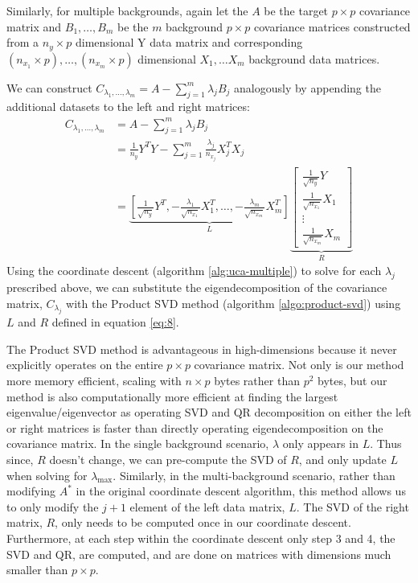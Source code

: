 \documentclass[12pt]{article}
\begin{document}
Similarly, for multiple backgrounds, again let the $A$ be the target $p \times p$ covariance matrix and $ B_1, \ldots, B_m$ be the $m$ background $p \times p$ covariance matrices constructed from a $n_y \times p$ dimensional Y data matrix and corresponding $(n_{x_1} \times p), \ldots, (n_{x_m}\times p)$ dimensional $X_1, \ldots X_m$ background data matrices.

We can construct $C_{\lambda_1, \ldots, \lambda_m} = A - \sum^{m}_{j=1}\lambda_jB_j$ analogously by appending the additional datasets to the left and right matrices:
\begin{align}
  C_{\lambda_1, \ldots, \lambda_m}&= A - \sum^{m}_{j=1}\lambda_jB_j \nonumber \\
                                  &=\frac{1}{n_y}Y^{T}Y -\sum_{j=1}^{m}{\frac{\lambda_{j}}{n_{x_j}}X_{j}^TX_{j}} \nonumber\\
                                  &=  \underbrace{\left[\frac{1}{\sqrt{n_y}}Y^T, -\frac{\lambda_1}{\sqrt{n_{x_{1}}}} X^T_1, \ldots, -\frac{\lambda_m}{\sqrt{n_{x_{m}}}}X^T_m\right]}_{L} \underbrace{\begin{bmatrix} \frac{1}{\sqrt{n_{y}}}Y \\ \frac{1}{\sqrt{n_{x_{1}}}}X_1 \\ \vdots \\ \frac{1}{\sqrt{n_{x_{m}}}}X_m \end{bmatrix}}_{R} \label{eq:8}
\end{align}
Using the coordinate descent (algorithm \ref{alg:uca-multiple}) to solve for each $\lambda_j$ prescribed above, we can substitute the eigendecomposition of the covariance matrix, $C_{\lambda_{j}}$ with the Product SVD method (algorithm \ref{algo:product-svd}) using $L$ and $R$ defined in equation \ref{eq:8}.

The Product SVD method is advantageous in high-dimensions because it never explicitly operates on the entire $p \times p$ covariance matrix. Not only is our method more memory efficient, scaling with $n\times p$ bytes rather than $p^2$ bytes, but our method is also computationally more efficient at finding the largest eigenvalue/eigenvector as operating SVD and QR decomposition on either the left or right matrices is faster than directly operating eigendecomposition on the covariance matrix. In the single background scenario,  $\lambda$ only appears in $L$. Thus since, $R$ doesn't change, we can pre-compute the SVD of $R$, and only update $L$ when solving for $\lambda_{\text{max}}$.
Similarly, in the multi-background scenario, rather than modifying $A^*$ in the original coordinate descent algorithm, this method allows us to only modify the $j+1$ element of the left data matrix, $L$.
The SVD of the right matrix, $R$, only needs to be computed once in our coordinate descent. Furthermore, at each step within the coordinate descent only step 3 and 4, the SVD and QR, are computed, and are done on matrices with dimensions much smaller than $p \times p$.
\end{document}
